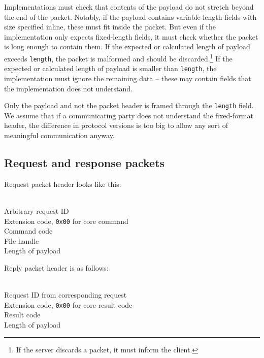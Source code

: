 Implementations must check that contents of the payload do not stretch beyond the end of the packet. Notably,
if the payload contains variable-length fields with size specified inline, these must fit inside the packet.
But even if the implementation only expects fixed-length fields, it must check whether the packet is long
enough to contain them. If the expected or calculated length of payload exceeds {\tt length}, the packet is
malformed and should be discarded.\footnote{If the server discards a packet, it must inform the client.} If
the expected or calculated length of payload is smaller than {\tt length}, the implementation must ignore the
remaining data -- these may contain fields that the implementation does not understand.

Only the payload and not the packet header is framed through the {\tt length} field. We assume that if
a communicating party does not understand the fixed-format header, the difference in protocol versions is too
big to allow any sort of meaningful communication anyway.

%

\subsection{Request and response packets}


\begin{samepage}
Request packet header looks like this:
\begin{description}[parsep=1pt]
	 \hfill \\
		Arbitrary request ID
	 \hfill \\
		Extension code, {\tt 0x00} for core command
	 \hfill \\
		Command code
	 \hfill \\
		File handle
	 \hfill \\
		Length of payload
\end{description}
\end{samepage}

\begin{samepage}
Reply packet header is as follows:
\begin{description}[parsep=1pt]
	 \hfill \\
		Request ID from corresponding request
	 \hfill \\
		Extension code, {\tt 0x00} for core result code
	 \hfill \\
		Result code
	 \hfill \\
		Length of payload
\end{description}
\end{samepage}


